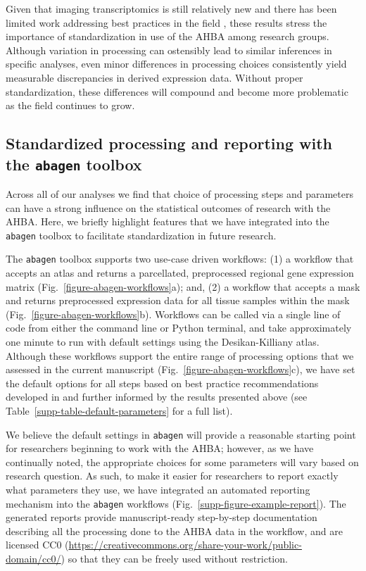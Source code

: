 \documentclass[12pt,aps,pra,reprint,showkeys]{revtex4-1}
\begin{document}
Given that imaging transcriptomics is still relatively new and there has been limited work addressing best practices in the field \citep[cf.][]{arnatkeviciute2019neuroimage}, these results stress the importance of standardization in use of the AHBA among research groups.
Although variation in processing can ostensibly lead to similar inferences in specific analyses, even minor differences in processing choices consistently yield measurable discrepancies in derived expression data.
Without proper standardization, these differences will compound and become more problematic as the field continues to grow.

\subsection*{Standardized processing and reporting with the \texttt{abagen} toolbox}

Across all of our analyses we find that choice of processing steps and parameters can have a strong influence on the statistical outcomes of research with the AHBA.
Here, we briefly highlight features that we have integrated into the \texttt{abagen} toolbox to facilitate standardization in future research.

The \texttt{abagen} toolbox supports two use-case driven workflows: (1) a workflow that accepts an atlas and returns a parcellated, preprocessed regional gene expression matrix (Fig.~\ref{figure-abagen-workflows}a); and, (2) a workflow that accepts a mask and returns preprocessed expression data for all tissue samples within the mask (Fig.~\ref{figure-abagen-workflows}b).
Workflows can be called via a single line of code from either the command line or Python terminal, and take approximately one minute to run with default settings using the Desikan-Killiany atlas.
Although these workflows support the entire range of processing options that we assessed in the current manuscript (Fig.~\ref{figure-abagen-workflows}c), we have set the default options for all steps based on best practice recommendations developed in \citet{arnatkeviciute2019neuroimage} and further informed by the results presented above (see Table~\ref{supp-table-default-parameters} for a full list).

We believe the default settings in \texttt{abagen} will provide a reasonable starting point for researchers beginning to work with the AHBA; however, as we have continually noted, the appropriate choices for some parameters will vary based on research question.
As such, to make it easier for researchers to report exactly what parameters they use, we have integrated an automated reporting mechanism into the \texttt{abagen} workflows (Fig.~\ref{supp-figure-example-report}).
The generated reports provide manuscript-ready step-by-step documentation describing all the processing done to the AHBA data in the workflow, and are licensed CC0 (\url{https://creativecommons.org/share-your-work/public-domain/cc0/}) so that they can be freely used without restriction.
\end{document}
